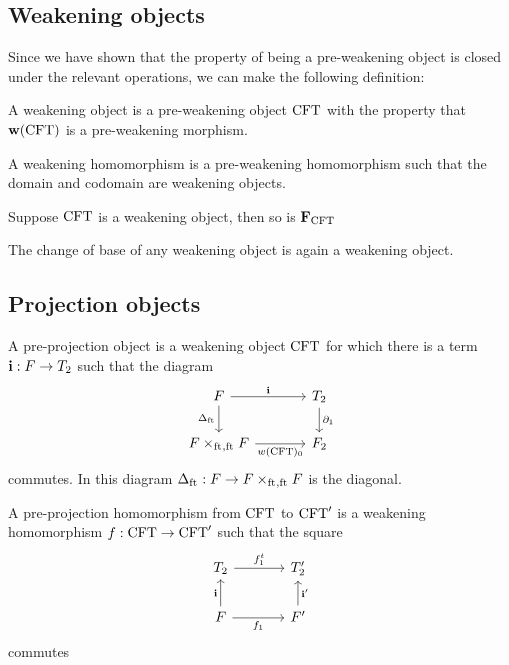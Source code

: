 \subsection{Weakening objects}
Since we have shown that the property of being a pre-weakening object is closed
under the relevant operations, we can make the following definition:

\begin{defn}
A weakening object is a pre-weakening object $\mathrm{CFT}$ with the property that
$\mathbf{w}(\mathrm{CFT})$ is a pre-weakening morphism.
\end{defn}

\begin{defn}
A weakening homomorphism is a pre-weakening homomorphism such that the domain
and codomain are weakening objects.
\end{defn}

\begin{thm}
Suppose $\mathrm{CFT}$ is a weakening object, then so is $\mathbf{F}_{\mathrm{CFT}}$
\end{thm}

\begin{thm}
The change of base of any weakening object is again a weakening object.
\end{thm}

\subsection{Projection objects}
\begin{defn}
A pre-projection object is a weakening object $\mathrm{CFT}$ for which there is a term
$\mathbf{i}:F\to T_2$ such that the diagram
\begin{equation*}
\begin{tikzcd}[column sep=large]
\stesysf \ar{r}{\mathbf{i}} \ar{d}[swap]{\Delta_{\eft}} & \stesyst_2 \ar{d}{\ebd[1]}\\
\pullback{\stesysf}{\stesysf}{\eft}{\eft} \ar{r}[swap]{w(\stesys)_0} & \stesysf_2
\end{tikzcd}
\end{equation*}
commutes. In this diagram $\Delta_{\eft}:\stesysf\to \pullback{\stesysf}{\stesysf}{\eft}{\eft}$ is the diagonal.
\end{defn}

\begin{defn}
A pre-projection homomorphism from $\mathrm{CFT}$ to $\mathrm{CFT}'$ is a weakening homomorphism
$f:\mathrm{CFT}\to \mathrm{CFT}'$ such that the square
\begin{equation*}
\begin{tikzcd}[column sep=large]
\stesyst_2
  \ar{r}{f^t_1}
  &
\stesyst_2'
  \\
\stesysf \ar{r}[swap]{f_1}
  \ar{u}{\mathbf{i}}
  &
\stesysf'
  \ar{u}[swap]{\mathbf{i}'}
\end{tikzcd}
\end{equation*}
commutes
\end{defn}

